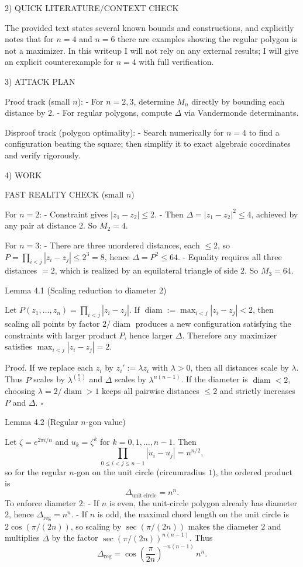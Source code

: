2) QUICK LITERATURE/CONTEXT CHECK

The provided text states several known bounds and constructions, and explicitly notes that for $n=4$ and
$n=6$ there are examples showing the regular polygon is not a maximizer.
In this writeup I will not rely on any external results; I will give an explicit counterexample for $n=4$
with full verification.

3) ATTACK PLAN

Proof track (small $n$):
- For $n=2,3$, determine $M_n$ directly by bounding each distance by $2$.
- For regular polygons, compute $\Delta$ via Vandermonde determinants.

Disproof track (polygon optimality):
- Search numerically for $n=4$ to find a configuration beating the square; then simplify it to exact
  algebraic coordinates and verify rigorously.

4) WORK

FAST REALITY CHECK (small $n$)

For $n=2$:
- Constraint gives $|z_1-z_2|\le 2$.
- Then $\Delta=|z_1-z_2|^2\le 4$, achieved by any pair at distance $2$.
So $M_2=4$.

For $n=3$:
- There are three unordered distances, each $\le 2$, so
  $P=\prod_{i<j}|z_i-z_j|\le 2^3=8$, hence $\Delta=P^2\le 64$.
- Equality requires all three distances $=2$, which is realized by an equilateral triangle of side $2$.
So $M_3=64$.

Lemma 4.1 (Scaling reduction to diameter $2$)

Let $P(z_1,\dots,z_n)=\prod_{i<j}|z_i-z_j|$.
If $\operatorname{diam}:=\max_{i<j}|z_i-z_j|<2$, then scaling all points by factor $2/\operatorname{diam}$
produces a new configuration satisfying the constraints with larger product $P$, hence larger $\Delta$.
Therefore any maximizer satisfies $\max_{i<j}|z_i-z_j|=2$.

Proof.
If we replace each $z_i$ by $z_i' := \lambda z_i$ with $\lambda>0$, then all distances scale by $\lambda$.
Thus $P$ scales by $\lambda^{\binom{n}{2}}$ and $\Delta$ scales by $\lambda^{n(n-1)}$.
If the diameter is $\operatorname{diam}<2$, choosing $\lambda=2/\operatorname{diam}>1$ keeps all pairwise
 distances $\le 2$ and strictly increases $P$ and $\Delta$.
$\square$

Lemma 4.2 (Regular $n$-gon value)

Let $\zeta= e^{2\pi i/n}$ and $u_k=\zeta^k$ for $k=0,1,\dots,n-1$.
Then
\[
  \prod_{0\le i<j\le n-1} |u_i-u_j| = n^{n/2},
\]
so for the regular $n$-gon on the unit circle (circumradius $1$), the ordered product is
\[
  \Delta_{\mathrm{unit\ circle}} = n^n.
\]
To enforce diameter $2$:
- If $n$ is even, the unit-circle polygon already has diameter $2$, hence $\Delta_{\mathrm{reg}}=n^n$.
- If $n$ is odd, the maximal chord length on the unit circle is $2\cos(\pi/(2n))$, so scaling by
  $\sec(\pi/(2n))$ makes the diameter $2$ and multiplies $\Delta$ by the factor
  $\sec(\pi/(2n))^{n(n-1)}$. Thus
\[
  \Delta_{\mathrm{reg}} = \cos\!\left(\frac{\pi}{2n}\right)^{-n(n-1)}\,n^n.
\]

